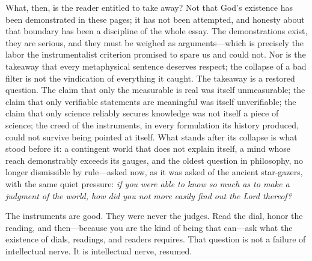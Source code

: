 What, then, is the reader entitled to take away? Not that God's existence has been demonstrated in these pages; it has not been attempted, and honesty about that boundary has been a discipline of the whole essay. The demonstrations exist, they are serious, and they must be weighed as arguments---which is precisely the labor the instrumentalist criterion promised to spare us and could not. Nor is the takeaway that every metaphysical sentence deserves respect; the collapse of a bad filter is not the vindication of everything it caught. The takeaway is a restored question. The claim that only the measurable is real was itself unmeasurable; the claim that only verifiable statements are meaningful was itself unverifiable; the claim that only science reliably secures knowledge was not itself a piece of science; the creed of the instruments, in every formulation its history produced, could not survive being pointed at itself. What stands after its collapse is what stood before it: a contingent world that does not explain itself, a mind whose reach demonstrably exceeds its gauges, and the oldest question in philosophy, no longer dismissible by rule---asked now, as it was asked of the ancient star-gazers, with the same quiet pressure: \emph{if you were able to know so much as to make a judgment of the world, how did you not more easily find out the Lord thereof?}

The instruments are good. They were never the judges. Read the dial, honor the reading, and then---because you are the kind of being that can---ask what the existence of dials, readings, and readers requires. That question is not a failure of intellectual nerve. It is intellectual nerve, resumed.

